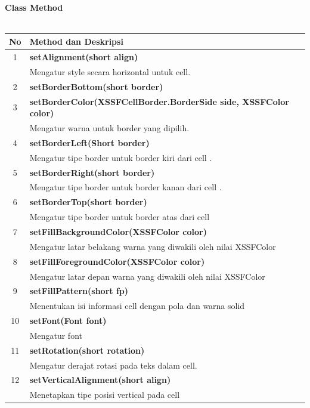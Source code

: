 \\
\noindent \textbf{Class Method}\\ \\
	\begin{tabular}{|c|p{12cm}|}
		\hline
		\textbf{No} & \textbf{Method dan Deskripsi} \\ \hline \hline
		1 & \textbf{setAlignment(short align)}\\
			&	Mengatur style secara horizontal untuk cell.\\ \hline 
		2 & \textbf{setBorderBottom(short border)}\\ \hline
		3 & \textbf{setBorderColor(XSSFCellBorder.BorderSide side, XSSFColor color)}\\
			&	Mengatur warna untuk border yang dipilih.\\ \hline
		4 & \textbf{setBorderLeft(Short border)}\\
			&	Mengatur tipe border untuk border kiri dari cell .\\ \hline	
		5 & \textbf{setBorderRight(short border)}\\
			&	Mengatur tipe border untuk border kanan dari cell .\\ \hline
		6 & \textbf{setBorderTop(short border)}\\
			&	Mengatur tipe border untuk border atas dari cell \\ \hline
		7 & \textbf{setFillBackgroundColor(XSSFColor color)}\\
			&	Mengatur latar belakang warna yang diwakili oleh nilai XSSFColor\\ \hline
		8 & \textbf{setFillForegroundColor(XSSFColor color)}\\
			&	Mengatur latar depan warna yang diwakili oleh nilai XSSFColor\\ \hline
		9 & \textbf{setFillPattern(short fp)}\\
			&	Menentukan isi informasi cell dengan pola dan warna solid\\ \hline
	  10 & \textbf{setFont(Font font)}\\
			 &	Mengatur font\\ \hline
		11 & \textbf{setRotation(short rotation)}\\
			 &	Mengatur derajat rotasi pada teks dalam cell.\\ \hline
		12 & \textbf{setVerticalAlignment(short align)}\\
			 &	Menetapkan tipe posisi vertical pada cell\\ \hline		
	\end{tabular}

